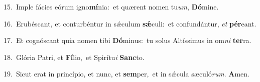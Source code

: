 {\numbfont\textcolor{\numbcolor}{15.}}~Imple fácies eórum igno\-\textbf{mí}\-nia:~\star et quærent nomen tu\-\textit{um}\-, \textbf{Dó}\-mine.\par
{\numbfont\textcolor{\numbcolor}{16.}}~Erubéscant, et conturbéntur in sǽculum \textbf{sǽ}\-culi:~\star et confundántur, \textit{et} \textbf{pér}\-eant.\par
{\numbfont\textcolor{\numbcolor}{17.}}~Et cognóscant quia nomen tibi \textbf{Dó}\-minus:~\star tu solus Altíssimus in om\textit{ni} \textbf{ter}\-ra.\par
{\numbfont\textcolor{\numbcolor}{18.}}~Glória Patri, et \textbf{Fí}\-lio,~\star et Spirítu\textit{i} \textbf{Sanc}\-to.\par
{\numbfont\textcolor{\numbcolor}{19.}}~Sicut erat in princípio, et nunc, et \textbf{sem}\-per,~\star et in sǽcula sæculó\-\textit{rum}\-. \textbf{A}\-men.\par
